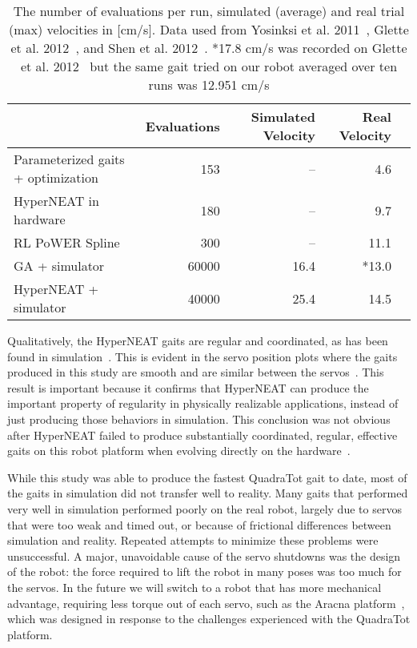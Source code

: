 \begin{table}
\caption{The number of evaluations per run, simulated (average) and real trial (max) velocities in [cm/s]. Data used from Yosinksi et al. 2011~\cite{yos:clune}, Glette et al. 2012~\cite{glette}, and Shen et al. 2012~\cite{haocheng}.
*17.8 cm/s was recorded on Glette et al. 2012~\cite{glette} but the same gait tried on our robot averaged over ten runs was 12.951 cm/s}  %
\begin{center}
\begin{tabular}{|l|r|r|r|r|}
\hline
                                         & Evaluations  & Simulated Velocity  & Real Velocity \\
\hline
Parameterized gaits + optimization    &153    & --    & 4.6 \\
\hline
HyperNEAT in hardware                  & 180         & --         &   9.7     \\
\hline
RL PoWER Spline                          & 300         & --         &   11.1 \\
\hline
GA + simulator              & 60000       & 16.4       &   *13.0     \\
\hline
HyperNEAT + simulator                      & 40000       & 25.4       &   14.5 \\
\hline
\end{tabular}
\end{center}
\label{resultsTable}
\end{table}

Qualitatively, the HyperNEAT gaits are regular and coordinated, as has been found in simulation~\cite{clune2009evolving, clune2011performance}. This is evident in the servo position plots where the gaits produced in this study are smooth and are similar between the servos~. This result is important because it confirms that HyperNEAT can produce the important property of regularity in physically realizable applications, instead of just producing those behaviors in simulation. This conclusion was not obvious after HyperNEAT failed to produce substantially coordinated, regular, effective gaits on this robot platform when evolving directly on the hardware~\cite{yos:clune}. 

While this study was able to produce the fastest QuadraTot gait to date, most of the gaits in simulation did not transfer well to reality. Many gaits that performed very well in simulation performed poorly on the real robot, largely due to servos that were too weak and timed out, or because of frictional differences between simulation and reality. Repeated attempts to minimize these problems were unsuccessful. 
A major, unavoidable cause of the servo shutdowns was the design of the robot: the force required to lift the robot in many poses was too much for the servos. In the future we will switch to a robot that has more mechanical advantage, requiring less torque out of each servo, such as the Aracna platform~\cite{lohmann2012aracna}, which was designed in response to the challenges experienced with the QuadraTot platform.  


